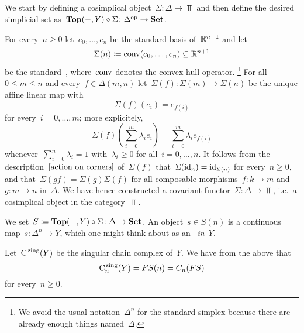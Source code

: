 \subsection{}

We start by defining a cosimplical object~$\Sigma \colon \Delta \to \Top$ and then define the desired simplicial set as~$\mathbf{Top}(-,Y) \circ \Sigma \colon \Delta^{\mathrm{op}} \to \mathbf{Set}$.

For every~$n \geq 0$ let~$e_0, \dotsc, e_n$ be the standard basis of~$\mathbb{R}^{n+1}$ and let
\[
  \Sigma (n)
  \coloneqq
  \operatorname{conv}(e_0, \dotsc, e_n)
  \subseteq
  \mathbb{R}^{n+1}
\]
be the standard~, where~$\operatorname{conv}$ denotes the convex hull operator.%
\footnote{We avoid the usual notation~$\Delta^n$ for the standard simplex because there are already enough things named~$\Delta$.}
For all~$0 \leq m \leq n$ and every~$f \in \Delta(m,n)$ let~$\Sigma(f) \colon \Sigma(m) \to \Sigma(n)$ be the unique affine linear map with
\begin{equation}
  \label{action on corners}
    \Sigma(f)(e_i)
  = e_{f(i)}
\end{equation}
for every~$i = 0, \dotsc, m$;
more explicitely,
\[
    \Sigma(f)\left( \sum_{i=0}^m \lambda_i e_i \right)
  = \sum_{i=0}^m \lambda_i e_{f(i)}
\]
whenever~$\sum_{i=0}^n \lambda_i = 1$ with~$\lambda_i \geq 0$ for all~$i = 0, \dotsc, n$.
It follows from the description~$\eqref{action on corners}$ of~$\Sigma(f)$ that~$\Sigma(\operatorname{id}_n) = \operatorname{id}_{\Sigma(n)}$ for every~$n \geq 0$, and that~$\Sigma(gf) = \Sigma(g) \Sigma(f)$ for all composable morphisms~$f \colon k \to m$ and~$g \colon m \to n$ in~$\Delta$.
We have hence constructed a covariant functor~$\Sigma \colon \Delta \to \Top$, i.e.\ a cosimplical object in the category~$\Top$.

We set~$S \coloneqq \mathbf{Top}(-,Y) \circ \Sigma \colon \Delta \to \mathbf{Set}$.
An object~$s \in S(n)$ is a continuous map~$s \colon \Delta^n \to Y$, which one might think about as an~\emph{ in~$Y$}.

Let~$\operatorname{C}^{\,\mathrm{sing}}(Y)$ be the singular chain complex of~$Y$.
We have from the above that
\[
  \operatorname{C}^{\,\mathrm{sing}}_n(Y) = FS(n) = C_n(FS)
\]
for every~$n \geq 0$.

